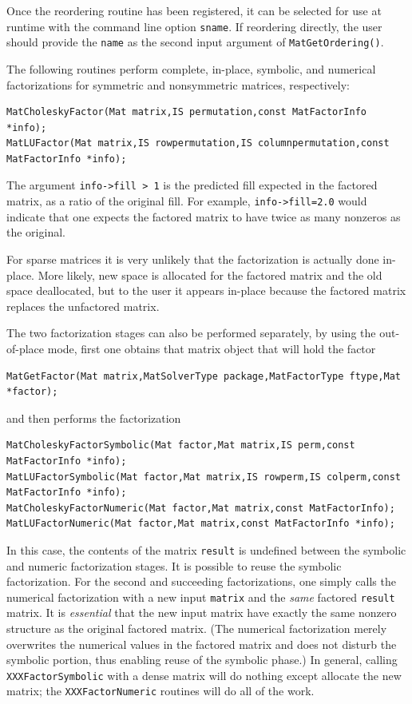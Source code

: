 {{{Once the reordering routine has been registered,
it can be selected for use at runtime with the
command line option  \lstinline{sname}.  If reordering directly,
the user should provide the \lstinline{name} as the second input argument of
\lstinline{MatGetOrdering()}.

The following routines perform complete, in-place, symbolic, and numerical
factorizations for symmetric and nonsymmetric matrices, respectively:
\begin{lstlisting}
MatCholeskyFactor(Mat matrix,IS permutation,const MatFactorInfo *info);
MatLUFactor(Mat matrix,IS rowpermutation,IS columnpermutation,const MatFactorInfo *info);
\end{lstlisting}
The argument \lstinline{info->fill > 1} is the predicted fill
expected in the factored matrix, as a ratio of the original fill.
For example, \lstinline{info->fill=2.0} would indicate that one expects the factored
matrix to have twice as many nonzeros as the original.

For sparse matrices it is very unlikely that the factorization
is actually done in-place. More likely, new space is allocated
for the factored matrix and the old space deallocated, but to the
user it appears in-place because the factored matrix replaces
the unfactored matrix.

The 
two
factorization
stages
can also be performed separately, by using the out-of-place mode, first
one obtains that matrix object that will hold the factor
\begin{lstlisting}
MatGetFactor(Mat matrix,MatSolverType package,MatFactorType ftype,Mat *factor);
\end{lstlisting}
and then performs the factorization
\begin{lstlisting}
MatCholeskyFactorSymbolic(Mat factor,Mat matrix,IS perm,const MatFactorInfo *info);
MatLUFactorSymbolic(Mat factor,Mat matrix,IS rowperm,IS colperm,const MatFactorInfo *info);
MatCholeskyFactorNumeric(Mat factor,Mat matrix,const MatFactorInfo);
MatLUFactorNumeric(Mat factor,Mat matrix,const MatFactorInfo *info);
\end{lstlisting}
In this case, the contents of the matrix \lstinline{result} is undefined between
the symbolic and numeric factorization stages.
It is possible to reuse the symbolic factorization. For the second and
succeeding factorizations, one simply calls the numerical factorization with a
new input \lstinline{matrix} and the {\em same} factored \lstinline{result} matrix.
It is {\em essential} that the new input matrix
have   %
exactly the same nonzero structure as the original factored matrix.
(The numerical factorization merely overwrites the numerical values in the
factored matrix and does not disturb the symbolic portion, thus enabling
reuse of the symbolic phase.)
In general, calling \lstinline{XXXFactorSymbolic} with a dense matrix will
do nothing except allocate the new matrix; the \lstinline{XXXFactorNumeric}
routines will do all of the work.

}}}
